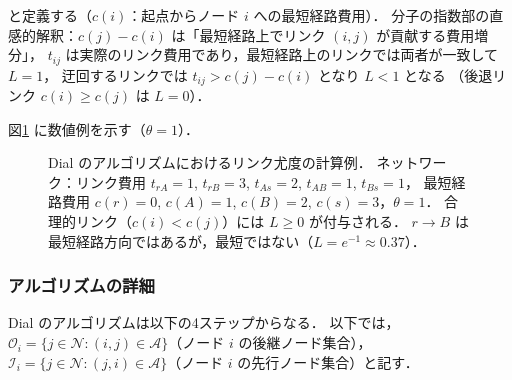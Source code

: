 と定義する（$c(i)$：起点からノード $i$ への最短経路費用）．
分子の指数部の直感的解釈：$c(j) - c(i)$ は「最短経路上でリンク $(i,j)$ が貢献する費用増分」，
$t_{ij}$ は実際のリンク費用であり，最短経路上のリンクでは両者が一致して $L=1$，
迂回するリンクでは $t_{ij} > c(j) - c(i)$ となり $L<1$ となる
（後退リンク $c(i) \geq c(j)$ は $L=0$）\cite{Dial1971}．

図\ref{fig:dial-example} に数値例を示す（$\theta = 1$）．

\begin{figure}[hbtp]
  \centering
  
  \caption{Dial のアルゴリズムにおけるリンク尤度の計算例．
           ネットワーク：リンク費用 $t_{rA}=1$, $t_{rB}=3$, $t_{As}=2$, $t_{AB}=1$, $t_{Bs}=1$，
           最短経路費用 $c(r)=0$, $c(A)=1$, $c(B)=2$, $c(s)=3$，$\theta=1$．
           合理的リンク（$c(i)<c(j)$）には $L \geq 0$ が付与される．
           $r \to B$ は最短経路方向ではあるが，最短ではない（$L = e^{-1} \approx 0.37$）．}
  \label{fig:dial-example}
\end{figure}

\subsubsection*{アルゴリズムの詳細}

Dial のアルゴリズムは以下の4ステップからなる\cite{Dial1971}．
以下では，$\mathcal{O}_i = \{j \in \mathcal{N} : (i,j) \in \mathcal{A}\}$（ノード $i$ の後継ノード集合），
$\mathcal{I}_i = \{j \in \mathcal{N} : (j,i) \in \mathcal{A}\}$（ノード $i$ の先行ノード集合）と記す．

